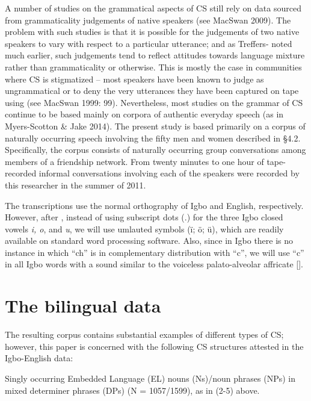 \documentclass[output=paper]{langsci/langscibook}
\begin{document}
A number of studies on the grammatical aspects of CS still rely on data sourced from grammaticality judgements of native speakers (see MacSwan 2009). The problem with such studies is that it is possible for the judgements of two native speakers to vary with respect to a particular utterance; and as Treffers-\citet{Daller1991} noted much earlier, such judgements tend to reflect attitudes towards language mixture rather than grammaticality or otherwise. This is mostly the case in communities where CS is stigmatized – most speakers have been known to judge as ungrammatical or to deny the very utterances they have been captured on tape using (see MacSwan 1999: 99). Nevertheless, most studies on the grammar of CS continue to be based mainly on corpora of authentic everyday speech (as in Myers-Scotton \& Jake 2014). The present study is based primarily on a corpus of naturally occurring speech involving the fifty men and women described in §4.2. Specifically, the corpus consists of naturally occurring group conversations among members of a friendship network. From twenty minutes to one hour of tape-recorded informal conversations involving each of the speakers were recorded by this researcher in the summer of 2011. 

The transcriptions use the normal orthography of Igbo and English, respectively. However, after \citet{Echeruo1998}, instead of using subscript dots (.) for the three Igbo closed vowels \textit{i, o}, and \textit{u}, we will use umlauted symbols (ï; ö; \"{u}), which are readily available on standard word processing software. Also, since in Igbo there is no instance in which “ch” is in complementary distribution with “c”, we will use “c” in all Igbo words with a sound similar to the voiceless palato-alveolar affricate []. 

\section{The bilingual data}

The resulting corpus contains substantial examples of different types of CS; however, this paper is concerned with the following CS structures attested in the Igbo-English data:

\begin{stylelsBulletList}
Singly occurring Embedded Language (EL) nouns (Ns)/noun phrases (NPs) in mixed determiner phrases (DPs) (N = 1057/1599), as in (2-5) above. 
\end{stylelsBulletList}
\end{document}
